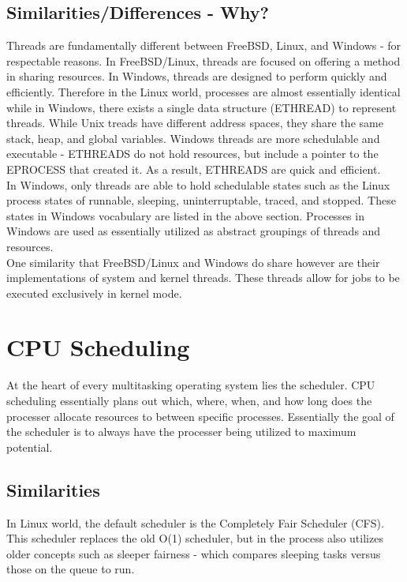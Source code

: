 \documentclass[letterpaper,10pt,titlepage]{article}
\begin{document}
\subsection{Similarities/Differences - Why?}

Threads are fundamentally different between FreeBSD, Linux, and Windows - for respectable reasons.  In FreeBSD/Linux, threads are focused on offering a method in sharing resources.  In Windows, threads are designed to perform quickly and efficiently.  Therefore in the Linux world, processes are almost essentially identical while in Windows, there exists a single data structure (ETHREAD) to represent threads.  While Unix treads have different address spaces, they share the same stack, heap, and global variables.  Windows threads are more schedulable and executable - ETHREADS do not hold resources, but include a pointer to the EPROCESS that created it.\cite{mwi5}  As a result, ETHREADS are quick and efficient.\\

In Windows, only threads are able to hold schedulable states such as the Linux process states of runnable, sleeping, uninterruptable, traced, and stopped.  These states in Windows vocabulary are listed in the above section.  Processes in Windows are used as essentially utilized as abstract groupings of threads and resources.\\

One similarity that FreeBSD/Linux and Windows do share however are their implementations of system and kernel threads.  These threads allow for jobs to be executed exclusively in kernel mode.\\

\section{CPU Scheduling}

At the heart of every multitasking operating system lies the scheduler.  CPU scheduling essentially plans out which, where, when, and how long does the processer allocate resources to between specific processes.  Essentially the goal of the scheduler is to always have the processer being utilized to maximum potential.

\subsection{Similarities}

In Linux world, the default scheduler is the Completely Fair Scheduler (CFS).  This scheduler replaces the old O(1) scheduler, but in the process also utilizes older concepts such as sleeper fairness - which compares sleeping tasks versus those on the queue to run.\\
\end{document}
